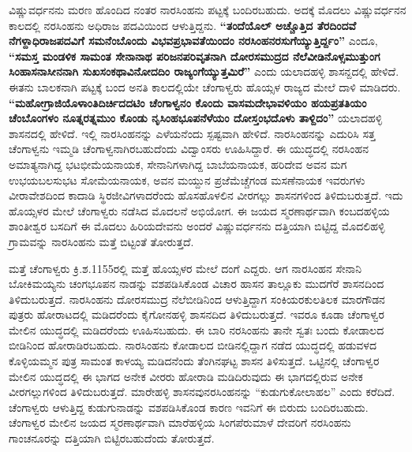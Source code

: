 ವಿಷ್ಣುವರ್ಧನನು ಮರಣ ಹೊಂದಿದ ನಂತರ ನಾರಸಿಂಹನು ಪಟ್ಟಕ್ಕೆ ಬಂದಿರಬಹುದು. ಅದಕ್ಕೆ ಮೊದಲು ವಿಷ್ಣುವರ್ಧನನ ಕಾಲದಲ್ಲಿ ನರಸಿಂಹನು ಅಧಿರಾಜ ಪದವಿಯಿಂದ ಆಳುತ್ತಿದ್ದನು. \textbf{“ತಂದೆಯೊಲ್​ ಅಚ್ಚೊತ್ತಿದ ತೆರದಿಂದವೆ ನೆಗಳ್ದಾಧಿರಾಜಪದವಿಗೆ ಸಮನೆಂಬೊಂದು ವಿಭವಪ್ರಭಾವತೆಯಿಂದಂ ನರಸಿಂಹನರಸುಗೆಯ್ಯುತ್ತಿರ್ದ್ದಂ”} ಎಂದೂ, \textbf{“ಸಮಸ್ತ ಮಂಡಳಿಕ ಸಾಮಂತ ಸೇನಾನಾಥ ಪರಿಜನಪರಿವೃತನಾಗಿ ದೋರಸಮುದ್ರದ ನೆಲೆವೀಡಿನೊಳ್ಸಮುತ್ತುಂಗ ಸಿಂಹಾಸನಾಸೀನನಾಗಿ ಸುಖಸಂಕಥಾ\general{\break }ವಿನೋದದಿಂ ರಾಜ್ಯಂಗೆಯ್ಯುತ್ತಮಿರೆ”} ಎಂದು ಯಲಾದಹಳ್ಳಿ ಶಾಸನ್ದದಲ್ಲಿ ಹೇಳಿದೆ. ಈತನು ಬಾಲಕನಾಗಿ ಪಟ್ಟಕ್ಕೆ ಬಂದ ಅನತಿ ಕಾಲದಲ್ಲಿಯೇ ಚೆಂಗಾಳ್ವರು ಹೊಯ್ಸಳ ರಾಜ್ಯದ ಮೇಲೆ ದಾಳಿ ಮಾಡಿದರು. \textbf{“ಮಹೋಗ್ರಾಜಿಯೊಳಾಂತಿದಿರ್ಚಿದದಟಿಂ ಚೆಂಗಾಳ್ವನಂ ಕೊಂದು ವಾಸಮದೇಭಾವಳಿಯಂ ಹಯಪ್ರತತಿಯಂ ಚೆಂಬೊಂಗಳಂ ನೂತ್ನರತ್ನಮುಂ ಕೊಂಡು\general{\break } ನೃಸಿಂಹಭೂಪನೆಳೆಯಂ ದೋಸ್ತಂಭದೊಳು ತಾಳ್ದಿದಂ”} ಯಲಾದಹಳ್ಳಿ ಶಾಸನದಲ್ಲಿ ಹೇಳಿದೆ. ಇಲ್ಲಿ ನಾರಸಿಂಹನನ್ನು ಎಳೆಯನೆಂದು ಸ್ಪಷ್ಟವಾಗಿ ಹೇಳಿದೆ. ನಾರಸಿಂಹನನ್ನು ಎದುರಿಸಿ ಸತ್ತ ಚೆಂಗಾಳ್ವನು ಇಮ್ಮಡಿ ಚೆಂಗಾಳ್ವನಾಗಿರಬಹುದೆಂದು ವಿದ್ವಾಂಸರು ಊಹಿಸಿದ್ದಾರೆ. ಈ ಯುದ್ಧದಲ್ಲಿ ನರಸಿಂಹನ ಅಮಾತ್ಯನಾಗಿದ್ದ ಭಟಭೀಮೆಯನಾಯಕ, ಸೇನಾನಿಗಳಾಗಿದ್ದ ಬಾಬೆಯನಾಯಕ, ಹರಿದೇವ ಅವನ ಮಗ ಉಭಯಬಲಸುಭಟ ಸೋಮೆಯನಾಯಕ, ಅವನ ಮಯ್ದುನ ಪ್ರಜೆಮೆಚ್ಚೆಗಂಡ ಮಸಣೆನಾಯಕ ಇವರುಗಳು ವೀರಾವೇಶದಿಂದ ಕಾದಾಡಿ ಸ್ಥಿರಜೀವಿಗಳಾದರೆಂದು ಹೊಸಹೊಳಲಿನ ವೀರಗಲ್ಲು ಶಾಸನಗಳಿಂದ ತಿಳಿದುಬರುತ್ತದೆ. ಇದು ಹೊಯ್ಸಳರ ಮೇಲೆ ಚೆಂಗಾಳ್ವರು ನಡೆಸಿದ ಮೊದಲನೆ ಅಭಿಯೋಗ. ಈ ಜಯದ ಸ್ಮರಣಾರ್ಥವಾಗಿ ಕಂಬದಹಳ್ಳಿಯ ಶಾಂತೀಶ್ವರ ಬಸದಿಗೆ ಈ ಮೊದಲು ಹಿರಿಯದೇವನು ಅಂದರೆ ವಿಷ್ಣುವರ್ಧನನು ದತ್ತಿಯಾಗಿ ಬಿಟ್ಟಿದ್ದ ಮೊದಲಿಹಳ್ಳಿ ಗ್ರಾಮವನ್ನು ನಾರಸಿಂಹನು ಮತ್ತೆ ಬಿಟ್ಟಂತೆ ತೋರುತ್ತದೆ.

ಮತ್ತೆ ಚೆಂಗಾಳ್ವರು ಕ್ರಿ.ಶ.1155ರಲ್ಲಿ ಮತ್ತೆ ಹೊಯ್ಸಳರ ಮೇಲೆ ದಂಗೆ ಎದ್ದರು. ಆಗ ನಾರಸಿಂಹನ ಸೇನಾನಿ ಬೋಕಿಮಯ್ಯನು ಚಂಗಭೂಪನ ನಾಡನ್ನು ವಶಪಡಿಸಿಕೊಂಡ ವಿಚಾರ ಹಾಸನ ತಾಲ್ಲೂಕು ಮುದಗೆರೆ ಶಾಸನದಿಂದ ತಿಳಿದುಬರುತ್ತದೆ. ನಾರಸಿಂಹನು ದೋರಸಮುದ್ರ ನೆಲೆಬೀಡಿನಿಂದ ಆಳುತ್ತಿದ್ದಾಗ ಸಂಕಿಯರಕುಲತಿಲಕ ಮಾರಗೌಡನ ಪುತ್ರರು ಹೋರಾಟದಲ್ಲಿ ಮಡಿದರೆಂದು ಕೈಗೋನಹಳ್ಳಿ ಶಾಸನದಿದ ತಿಳಿದುಬರುತ್ತದೆ. ಇವರೂ ಕೂಡಾ ಚೆಂಗಾಳ್ವರ ಮೇಲಿನ ಯುದ್ಧದಲ್ಲಿ ಮಡಿದರೆಂದು ಊಹಿಸಬಹುದು. ಈ ಬಾರಿ ನರಸಿಂಹನು ತಾನೇ ಸ್ವತಃ ಬಂದು ಕೋಡಾಲದ ಬೀಡಿನಿಂದ ಹೋರಾಡಿರಬಹುದು. ನಾರಸಿಂಹನು ಕೋಡಾಲದ ಬೀಡಿನಲ್ಲಿದ್ದಾಗ ನಡೆದ ಯುದ್ಧದಲ್ಲಿ ಹಡುವಳದ ಕೊಳ್ಳಿಯಮ್ಮನ ಪುತ್ರ ಸಾಮಂತ ಕಾಳಯ್ಯ ಮಡಿದನೆಂದು ತೆಂಗಿನಘಟ್ಟ ಶಾಸನ ತಿಳಿಸುತ್ತದೆ. ಒಟ್ಟಿನಲ್ಲಿ ಚೆಂಗಾಳ್ವರ ಮೇಲಿನ ಯುದ್ಧದಲ್ಲಿ ಈ ಭಾಗದ ಅನೇಕ ವೀರರು ಹೋರಾಡಿ ಮಡಿದಿರುವುದು ಈ ಭಾಗದಲ್ಲಿರುವ ಅನೇಕ ವೀರಗಲ್ಲುಗಳಿಂದ ತಿಳಿದುಬರುತ್ತದೆ. ಮಾರೇಹಳ್ಳಿ ಶಾಸನವುನರಸಿಂಹನನ್ನು “ಕುಡುಗುಕೋಲಾಹಲ” ಎಂದು ಕರೆದಿದೆ. ಚೆಂಗಾಳ್ವರು ಆಳುತ್ತಿದ್ದ ಕುಡುಗುನಾಡನ್ನು ವಶಪಡಿಸಿಕೊಂಡ ಕಾರಣ ಇವನಿಗೆ ಈ ಬಿರುದು ಬಂದಿರಬಹುದು. ಚೆಂಗಾಳ್ವರ ಮೇಲಿನ ಜಯದ ಸ್ಮರಣಾರ್ಥವಾಗಿ ಮಾರೆಹಳ್ಳಿಯ ಸಿಂಗಪೆರುಮಾಳೆ ದೇವರಿಗೆ ನರಸಿಂಹನು ಗಾಂಚನೂರನ್ನು ದತ್ತಿಯಾಗಿ ಬಿಟ್ಟಿರಬಹುದೆಂದು ತೋರುತ್ತದೆ. 

